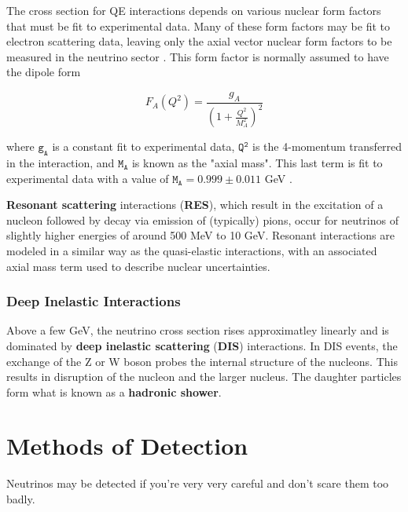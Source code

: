 The cross section for QE interactions depends on various nuclear form factors that must be fit to experimental data.
Many of these form factors may be fit to electron scattering data, leaving only the axial vector nuclear form factors to be measured in the neutrino sector \cite{Formaggio-Xsec}.
This form factor is normally assumed to have the dipole form 

\begin{equation}
F_A\left(Q^2\right) = \frac{g_A}{\left(1+\frac{Q^2}{M_A^2}\right)^2}
\label{eq:axial_mass_eq}
\end{equation}

where $\mathtt{g_A}$ is a constant fit to experimental data, $\mathtt{Q^2}$ is the 4-momentum transferred in the interaction, and $\mathtt{M_A}$ is known as the "axial mass".
This last term is fit to experimental data with a value of $\mathtt{M_A = 0.999 \pm 0.011}$ GeV .

\textbf{Resonant scattering} interactions (\textbf{RES}), which result in the excitation of a nucleon followed by decay via emission of (typically) pions, occur for neutrinos of slightly higher energies of around 500 MeV to 10 GeV.
Resonant interactions are modeled in a similar way as the quasi-elastic interactions, with an associated axial mass term used to describe nuclear uncertainties.

\subsubsection{Deep Inelastic Interactions}
Above a few GeV, the neutrino cross section rises approximatley linearly and is dominated by \textbf{deep inelastic scattering} (\textbf{DIS}) interactions.
In DIS events, the exchange of the Z or W boson probes the internal structure of the nucleons.
This results in disruption of the nucleon and the larger nucleus.
The daughter particles form what is known as a \textbf{hadronic shower}.

\label{sec:detection_methods}
\section{Methods of Detection}
Neutrinos may be detected if you're very very careful and don't scare them too badly.
